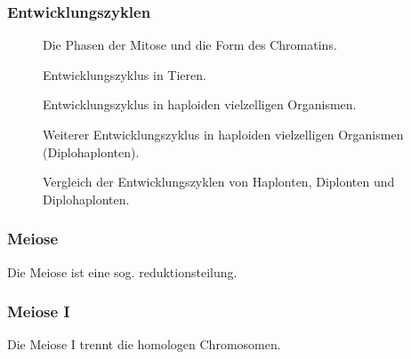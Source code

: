 

\subsubsection{Entwicklungszyklen}

\begin{figure}[H]
    \caption{Die Phasen der Mitose und die Form des Chromatins.}
\end{figure}

\begin{figure}[H]
    \caption{Entwicklungszyklus in Tieren.}
\end{figure}

\begin{figure}[H]
    \caption{Entwicklungszyklus in haploiden vielzelligen Organismen.}
\end{figure}


\begin{figure}[H]
    \caption{Weiterer Entwicklungszyklus in haploiden vielzelligen Organismen (Diplohaplonten).}
\end{figure}


\begin{figure}[H]
    \caption{Vergleich der Entwicklungszyklen von Haplonten, Diplonten und Diplohaplonten.}
\end{figure}



\subsubsection{Meiose}

Die Meiose ist eine sog. \gls{reduktionsteilung}.



\subsubsection*{Meiose I}
Die Meiose I trennt die homologen Chromosomen.

